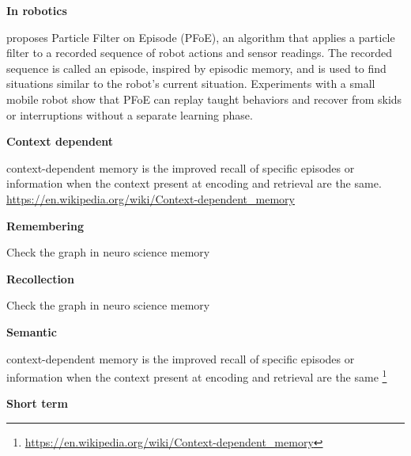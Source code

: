 \documentclass{book}
\providecommand{\ProjectDeepHeading}[2]{%
    \par\medskip\noindent\textbf{#2}\par\smallskip
}
\providecommand{\seefootnotehere}[1]{\footnote{\url{#1}}}
\begin{document}
    
    \ProjectDeepHeading{18}{In robotics}
        \cite{ueda-2019-particle-filter-on-episode} proposes Particle Filter on Episode (PFoE), an algorithm that applies a particle filter to a recorded sequence of robot actions and sensor readings. The recorded sequence is called an episode, inspired by episodic memory, and is used to find situations similar to the robot’s current situation. Experiments with a small mobile robot show that PFoE can replay taught behaviors and recover from skids or interruptions without a separate learning phase.

\ProjectDeepHeading{12}{Context dependent}


context-dependent memory is the improved recall of specific episodes or information when the context present at encoding and retrieval are the same. \url{https://en.wikipedia.org/wiki/Context-dependent_memory}

\ProjectDeepHeading{13}{Remembering}


Check the graph in neuro science memory

\ProjectDeepHeading{14}{Recollection}


Check the graph in neuro science memory

\ProjectDeepHeading{11}{Semantic}


context-dependent memory is the improved recall of specific episodes or information when the context present at encoding and retrieval are the same \seefootnotehere{https://en.wikipedia.org/wiki/Context-dependent_memory}

\ProjectDeepHeading{9}{Short term}

\end{document}
